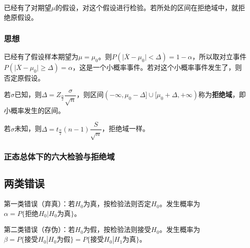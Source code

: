 \documentclass[UTF8, 12pt]{ctexart}
\begin{document}
已经有了对期望$\mu$的假设，对这个假设进行检验。若所处的区间在拒绝域中，就拒绝原假设。

\subsubsection{思想}

已经有了假设样本期望为$\mu=\mu_0$。则$P(\vert\overline{X}-\mu_0\vert<\Delta)=1-\alpha$，所以取对立事件$P(\vert\overline{X}-\mu_0\vert\geqslant\Delta)=\alpha$，这是一个小概率事件。若对这个小概率事件发生了，则否定原假设。

若$\sigma$已知，则$\Delta=Z_\frac{\alpha}{2}\dfrac{\sigma}{\sqrt{n}}$，则区间$(-\infty,\mu_0-\Delta]\cup[\mu_0+\Delta,+\infty)$称为\textbf{拒绝域}，即小概率发生的区间。

若$\sigma$未知，则$\Delta=t_\frac{\alpha}{2}(n-1)\dfrac{S}{\sqrt{n}}$，拒绝域一样。

\subsubsection{正态总体下的六大检验与拒绝域}

\subsection{两类错误}

第一类错误（弃真）：若$H_0$为真，按检验法则否定$H_0$。发生概率为$\alpha=P\{\text{拒绝}H_0|H_0\text{为真}\}$。

第二类错误（存伪）：若$H_0$为假，按检验法则接受$H_0$。发生概率为$\beta=P\{\text{接受}H_0|H_0\text{为假}\}=P\{\text{接受}H_0|H_1\text{为真}\}$。
\end{document}
